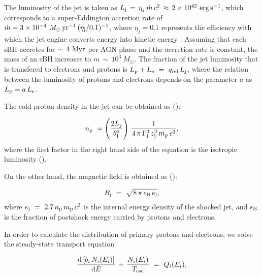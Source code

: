 \documentclass[baaa]{baaa}
\begin{document}
The luminosity of the jet is taken as $L_{\rm j} \, = \, \eta_j \, \Dot{m} \, c^2 \,  \approx \, 2\times 10^{42} ~ \rm erg \, s^{-1}$, which corresponds to a super-Eddington accretion rate of $\Dot{m} = 3\times 10^{-4} ~ M_{\odot} \, \rm yr^{-1} \, (\eta_j/0.1)^{-1}$, where $\eta_j = 0.1$ represents the efficiency with which the jet engine converts energy into kinetic energy \citep{Tagawa2023}. Assuming that each sBH accretes for $\sim \,4 ~ \rm Myr$ per AGN phase and the accretion rate is constant, the mass of an sBH increases to $m \, \sim \, 10^3 ~ M_{\odot}$. The fraction of the jet luminosity that is transfered to electrons and protons is
$L_{\rm p} + L_{\rm e} \ = \ q_{\rm rel} \, L_{{\rm j}}$, where the relation between the luminosity of protons and electrons depends on the parameter $a$ as $L_{\rm p}  =  a \, L_{\rm e}$.

The cold proton density in the jet can be obtained as (\citealt{Tagawa2023}):


\begin{equation}
        n_{\rm p} \ = \left( \frac{2 L_j}{\theta_{{\rm j}}^{2}}\right) \, \frac{1}{4 \, \pi \, \Gamma_{{\rm j}}^{2} \, z_{{\rm j}}^{2} \, m_{\rm p} \, c^3},
\end{equation}
\noindent where the first factor in the right hand side of the equation is the isotropic luminosity (\citealp{Denton2018}).

On the other hand, the magnetic field is obtained as (\citealt{Tagawa2023}):

\begin{equation}
        B_{\rm j} \ = \ \sqrt{8 \, \pi \, \epsilon_{\rm B} \, e_{\rm j}},
\end{equation}
\noindent where $e_{\rm j} \ = \ 2.7 \, n_{\rm p} \, m_{\rm p} \, c^2$ is the internal energy density of the shocked jet, and $\epsilon_{\rm B}$ is the fraction of postshock energy carried by protons and electrons.

In order to calculate the distribution of primary protons and electrons, we solve the steady-state transport equation

\begin{equation} \label{equation}
     \frac{{\rm d}\left[b_{i} \, N_{i}(E_i)\right]}{{\rm d}E} \, + \, \frac{N_{i}(E_i)}{T_{\rm esc}} \ = \ Q_{i}(E_i),
\end{equation}
\end{document}
